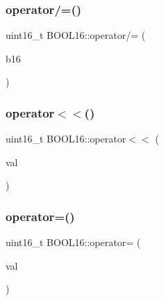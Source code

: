 \hypertarget{struct_b_o_o_l16_a79bcf50fe8c4adaeee2bcf3c20cdeb8a}{}\label{struct_b_o_o_l16_a79bcf50fe8c4adaeee2bcf3c20cdeb8a} 
\subsubsection{\texorpdfstring{operator/=()}{operator/=()}\hspace{0.1cm}{\footnotesize\ttfamily [2/2]}}
{\footnotesize\ttfamily uint16\+\_\+t B\+O\+O\+L16\+::operator/= (\begin{DoxyParamCaption}\item[{const \hyperlink{struct_b_o_o_l16}{B\+O\+O\+L16}}]{b16 }\end{DoxyParamCaption})\hspace{0.3cm}{\ttfamily [inline]}}

\hypertarget{struct_b_o_o_l16_a229cb6ed9115f7908e779311c2f95b9c}{}\label{struct_b_o_o_l16_a229cb6ed9115f7908e779311c2f95b9c} 
\subsubsection{\texorpdfstring{operator$<$$<$()}{operator<<()}}
{\footnotesize\ttfamily uint16\+\_\+t B\+O\+O\+L16\+::operator$<$$<$ (\begin{DoxyParamCaption}\item[{const uint16\+\_\+t}]{val }\end{DoxyParamCaption})\hspace{0.3cm}{\ttfamily [inline]}}

\hypertarget{struct_b_o_o_l16_a337925a096cb05f2d729cec233f672f4}{}\label{struct_b_o_o_l16_a337925a096cb05f2d729cec233f672f4} 
\subsubsection{\texorpdfstring{operator=()}{operator=()}}
{\footnotesize\ttfamily uint16\+\_\+t B\+O\+O\+L16\+::operator= (\begin{DoxyParamCaption}\item[{const uint16\+\_\+t}]{val }\end{DoxyParamCaption})\hspace{0.3cm}{\ttfamily [inline]}}

